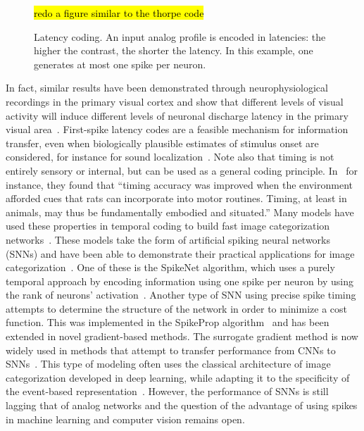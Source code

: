 \documentclass[brainsci, %
               review,submit,pdftex,moreauthors
               ]{Definitions/mdpi}
\newcommand{\note}[1]{{\sethlcolor{yellow}\hl{#1}}}
\begin{document}
\begin{figure}
\centering
\note{redo a figure similar to the thorpe code}%
\caption{Latency coding. An input analog profile is encoded in latencies: the higher the contrast, the shorter the latency. In this example, one generates at most one spike per neuron.
}\label{fig:roc}
\end{figure}
In fact, similar results have been demonstrated through neurophysiological recordings in the primary visual cortex and show that different levels of visual activity will induce different levels of neuronal discharge latency in the primary visual area~\citep{celebrini_dynamics_1993}. First-spike latency codes are a feasible mechanism for information transfer, even when biologically plausible estimates of stimulus onset are considered, for instance for sound localization~\citep{chase_first-spike_2007}.  Note also that timing is not entirely sensory or internal, but can be used as a general coding principle. In~\citep{safaie_turning_2020} for instance, they found that ``timing accuracy was improved when the environment afforded cues that rats can incorporate into motor routines. Timing, at least in animals, may thus be fundamentally embodied and situated.''  Many models have used these properties in temporal coding to build fast image categorization networks~\citep{gautrais_rate_1998,delorme_spikenet_1999, perrinet_coding_2004}. These models take the form of artificial spiking neural networks (SNNs) and have been able to demonstrate their practical applications for image categorization~\citep{delorme_ultra-rapid_2000}. One of these is the SpikeNet algorithm, which uses a purely temporal approach by encoding information using one spike per neuron by using the rank of neurons' activation~\citep{delorme_spikenet_1999,bonilla_analyzing_2022}. Another type of SNN using precise spike timing attempts to determine the structure of the network in order to minimize a cost function. This was implemented in the SpikeProp algorithm~\citep{bohte_error-backpropagation_2002} and has been extended in novel gradient-based methods. The surrogate gradient method is now widely used in methods that attempt to transfer performance from CNNs to SNNs~\citep{zenke_remarkable_2021}. This type of modeling often uses the classical architecture of image categorization developed in deep learning, while adapting it to the specificity of the event-based representation~\citep{goltz_fast_2021}. However, the performance of SNNs is still lagging that of analog networks and the question of the advantage of using spikes in machine learning and computer vision remains open. 
\end{document}
